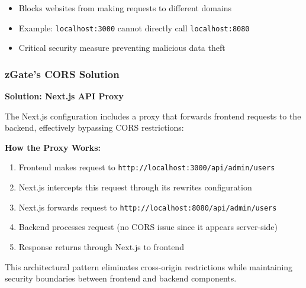 \begin{itemize}
    \item Blocks websites from making requests to different domains
    \item Example: \texttt{localhost:3000} cannot directly call \texttt{localhost:8080}
    \item Critical security measure preventing malicious data theft
\end{itemize}

\subsubsection{zGate's CORS Solution}

\textbf{Solution: Next.js API Proxy}

The Next.js configuration includes a proxy that forwards frontend requests to the backend, effectively bypassing CORS restrictions:

\begin{mdframed}[backgroundcolor=blue!5, linecolor=blue!40, linewidth=2pt]
\textbf{How the Proxy Works:}

\begin{enumerate}
    \item Frontend makes request to \texttt{http://localhost:3000/api/admin/users}
    \item Next.js intercepts this request through its rewrites configuration
    \item Next.js forwards request to \texttt{http://localhost:8080/api/admin/users}
    \item Backend processes request (no CORS issue since it appears server-side)
    \item Response returns through Next.js to frontend
\end{enumerate}
\end{mdframed}

This architectural pattern eliminates cross-origin restrictions while maintaining security boundaries between frontend and backend components.

